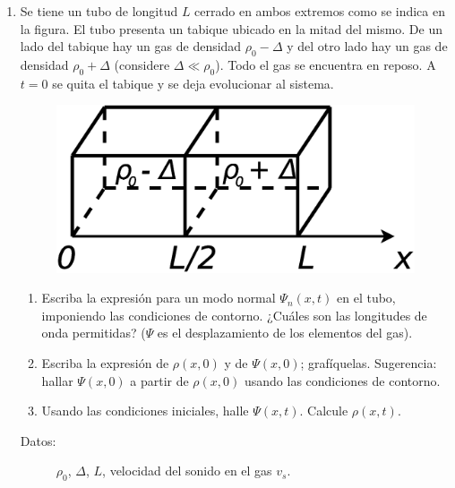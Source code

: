 \documentclass[11pt,spanish,a4paper]{article}
\begin{document}
\begin{enumerate}
\item Se tiene un tubo de longitud $L$ cerrado en ambos extremos como se
indica en la figura. El tubo presenta un tabique ubicado en la mitad
del mismo. De un lado del tabique hay un gas de densidad $\rho_{0}-\Delta$
y del otro lado hay un gas de densidad $\rho_{0}+\Delta$ (considere
$\Delta\ll\rho_{0}$). Todo el gas se encuentra en reposo. A $t=0$
se quita el tabique y se deja evolucionar al sistema.
\begin{figure}[H]
\centering{}\includegraphics[clip,scale=0.25]{ej1-30}
\end{figure}
\begin{enumerate}
	\item Escriba la expresión para un modo normal $\Psi_{n}(x,t)$ en el tubo,
imponiendo las condiciones de contorno. ¿Cuáles son las longitudes
de onda permitidas? ($\Psi$ es el desplazamiento de los elementos
del gas). 
	\item Escriba la expresión de $\rho(x,0)$ y de $\Psi(x,0)$; grafíquelas.
Sugerencia: hallar $\Psi(x,0)$ a partir de $\rho(x,0)$ usando las
condiciones de contorno. 
	\item Usando las condiciones iniciales, halle $\Psi(x,t)$. Calcule $\rho(x,t)$.
\end{enumerate}
\begin{description}
	\item [{Datos:}] $\rho_{0}$, $\Delta$, $L$, velocidad del sonido en el gas $v_{s}$.
\end{description}



\end{enumerate}
\end{document}
